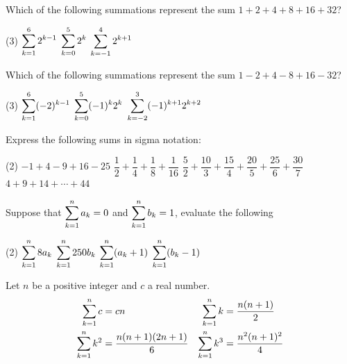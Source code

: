 \documentclass[../mathNotesPreamble]{subfiles}
\begin{document}
  \begin{ex*}
    Which of the following summations represent the sum $1+2+4+8+16+32$?
    \begin{tasks}(3)
      \task $\ds\sum\kto^6 2^{k-1}$
      \task $\ds\sum\kto[0]^5 2^k$
      \task $\ds\sum\kto[-1]^4 2^{k+1}$
    \end{tasks}
  \end{ex*}
  
  \begin{ex*}
    Which of the following summations represent the sum $1-2+4-8+16-32$?
    \begin{tasks}(3)
      \task $\ds\sum\kto^6 (-2)^{k-1}$
      \task $\ds\sum\kto[0]^5 (-1)^k2^k$
      \task $\ds\sum\kto[-2]^3 (-1)^{k+1}2^{k+2}$
    \end{tasks}
  \end{ex*}
  \pagebreak
  
  \begin{ex*}
    Express the following sums in sigma notation:
  \end{ex*}
  \begin{tasks}[after-item-skip=\stretch{1}](2)
    \task $-1+4-9+16-25$
    \task $\dfrac{1}{2}+\dfrac{1}{4}+\dfrac{1}{8}+\dfrac{1}{16}$
    \task $\dfrac{5}{2}+\dfrac{10}{3}+\dfrac{15}{4}+\dfrac{20}{5}+\dfrac{25}{6}+\dfrac{30}{7}$
    \task $4+9+14+\cdots+44$
  \end{tasks}
  
  \begin{ex*}
    Suppose that $\Sum\kto^n a_k=0$ and $\Sum\kto^n b_k=1$, evaluate the following
  \end{ex*}
  \begin{tasks}[after-item-skip=\stretch{1}](2)
    \task $\ds\sum\kto^n 8a_k$
    \task $\ds\sum\kto^n 250b_k$
    \task $\ds\sum\kto^n (a_k+1)$
    \task $\ds\sum\kto^n (b_k-1)$
  \end{tasks}
  \pagebreak
  
  \begin{thmBox*}
    Let $n$ be a positive integer and $c$ a real number.
    \begin{align*}
      \sum\kto^n c&=cn& 
      \sum\kto^n k &=\frac{n(n+1)}{2}\\
      \sum\kto^n k^2&=\frac{n(n+1)(2n+1)}{6}&
      \sum\kto^n k^3&=\frac{n^2(n+1)^2}{4}
    \end{align*}
  \end{thmBox*}
  
\end{document}

